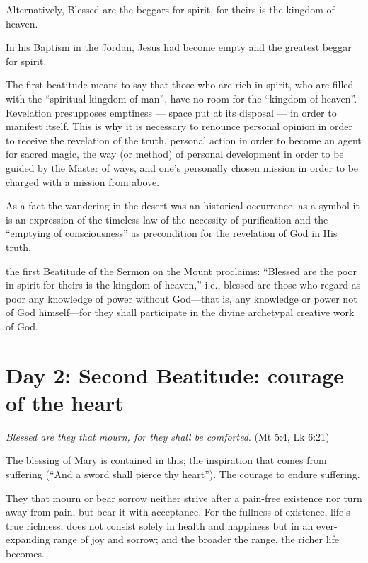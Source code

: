 Alternatively, Blessed are the beggars for spirit, for theirs is the kingdom of heaven.

In his Baptism in the Jordan, Jesus had become empty and the greatest beggar for spirit.

\begin{quotex}
The first beatitude means to say that those who are rich in spirit, who are filled with the ``spiritual kingdom of man'', have no room for the ``kingdom of heaven''. Revelation presupposes emptiness — space put at its disposal — in order to manifest itself. This is why it is necessary to renounce personal opinion in order to receive the revelation of the truth, personal action in order to become an agent for sacred magic, the way (or method) of personal development in order to be guided by the Master of ways, and one's personally chosen mission in order to be charged with a mission from above.

\end{quotex}
As a fact the wandering in the desert was an historical occurrence, as a symbol it is an expression of the timeless law of the necessity of purification and the ``emptying of consciousness'' as precondition for the revelation of God in His truth.

\begin{quotex}
the first Beatitude of the Sermon on the Mount proclaims: ``Blessed are the poor in spirit for theirs is the kingdom of heaven,'' i.e., blessed are those who regard as poor any knowledge of power without God—that is, any knowledge or power not of God himself—for they shall participate in the divine archetypal creative work of God. 

\end{quotex}

\section{Day 2: Second Beatitude: courage of the heart}

\emph{Blessed are they that mourn, for they shall be comforted}. (Mt 5:4, Lk 6:21)

The blessing of Mary is contained in this; the inspiration that comes from suffering (``And a sword shall pierce thy heart''). The courage to endure suffering.

\begin{quotex}
They that mourn or bear sorrow neither strive after a pain-free existence nor turn away from pain, but bear it with acceptance. For the fullness of existence, life's true richness, does not consist solely in health and happiness but in an ever-expanding range of joy and sorrow; and the broader the range, the richer life becomes.

\end{quotex}

